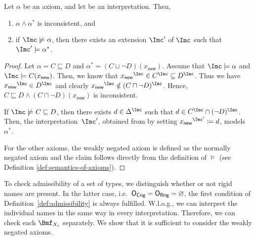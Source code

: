 \begin{lemma}\label{lem:weakly-negation-inconsistent}
  Let $\alpha$ be an axiom, and let \I be an interpretation. Then,
  \begin{enumerate}
  \item $\alpha\land\alpha^{*}$ is inconsistent, and
  \item if $\I\not\models\alpha$, then there exists an extension $\I'$ of $\I$ such that $\I'\models\alpha^{*}$.
  \end{enumerate}
\end{lemma}
\begin{proof}
  Let $\alpha = C \sqsubseteq D$ and $\alpha^{*} = (C \sqcup \lnot D)(x_{\mathsf{new}})$. Assume
  that $\I \models \alpha$ and $\I \models C(x_{\mathsf{new}})$.  Then, we know that
  ${x_{\mathsf{new}}}^{\I} \in C^{\I} \subseteq D^{\I}$. Thus we have
  ${x_{\mathsf{new}}}^{\I} \in D^{\I}$ and clearly
  ${x_{\mathsf{new}}}^{\I} \notin (C \sqcap \lnot D)^{\I}$. Hence,
  $C \sqsubseteq D \land (C \sqcap \lnot D)(x_{\mathsf{new}})$ is inconsistent.

  If $\I\not\models C \sqsubseteq D$, then there exists $d\in\Delta^{\I}$ such that
  $d \in C^{\I} \cap (\lnot D)^{\I}$. Then, the interpretation~$\I'$, obtained from \I by setting
  ${x_{\mathsf{new}}}^{\I'} \coloneqq d$, models $\alpha^{*}$.

  For the other axioms, the weakly negated axiom is defined as the normally negated axiom and the
  claim follows directly from the definition of $\models$ (see Definition
  \ref{def:semantics-of-axioms}).
\end{proof}

To check admissibility of a set of types, we distinguish whether or not rigid names are present. In
the latter case, i.e.\ $\mathsf{O_{Crig}}=\mathsf{O_{Rrig}}=\varnothing$, the first condition of
Definition~\ref{def:admissibility} is always fulfilled. W.l.o.g., we can interpret the individual
names in the same way in every interpretation. Therefore, we can check each $\Bmf_{X_{i}}$ separately. We
show that it is sufficient to consider the weakly negated axioms.



